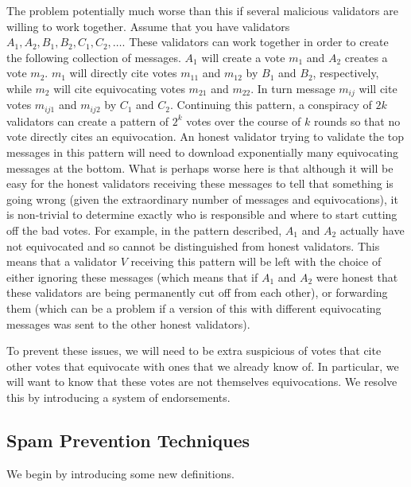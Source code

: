 \documentclass[12pt, fleqn]{article}
\begin{document}
The problem potentially much worse than this if several malicious validators are willing to work together. Assume that you have validators $A_1,A_2,B_1,B_2,C_1,C_2,\ldots.$ These validators can work together in order to create the following collection of messages. $A_1$ will create a vote $m_1$ and $A_2$ creates a vote $m_2$. $m_1$ will directly cite votes $m_{11}$ and $m_{12}$ by $B_1$ and $B_2$, respectively, while $m_2$ will cite equivocating votes $m_{21}$ and $m_{22}$. In turn message $m_{ij}$ will cite votes $m_{ij1}$ and $m_{ij2}$ by $C_1$ and $C_2$. Continuing this pattern, a conspiracy of $2k$ validators can create a pattern of $2^k$ votes over the course of $k$ rounds so that no vote directly cites an equivocation. An honest validator trying to validate the top messages in this pattern will need to download exponentially many equivocating messages at the bottom. What is perhaps worse here is that although it will be easy for the honest validators receiving these messages to tell that something is going wrong (given the extraordinary number of messages and equivocations), it is non-trivial to determine exactly who is responsible and where to start cutting off the bad votes. For example, in the pattern described, $A_1$ and $A_2$ actually have not equivocated and so cannot be distinguished from honest validators. This means that a validator $V$ receiving this pattern will be left with the choice of either ignoring these messages (which means that if $A_1$ and $A_2$ were honest that these validators are being permanently cut off from each other), or forwarding them (which can be a problem if a version of this with different equivocating messages was sent to the other honest validators).

To prevent these issues, we will need to be extra suspicious of votes that cite other votes that equivocate with ones that we already know of. In particular, we will want to know that these votes are not themselves equivocations. We resolve this by introducing a system of endorsements.


\subsection{Spam Prevention Techniques}

We begin by introducing some new definitions.

\end{document}
